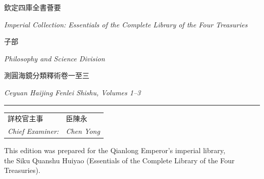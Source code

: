 \documentclass[11pt,a4paper]{article}
\newcommand{\shortline}{\noindent\rule{0.5\textwidth}{0.4pt}\par}
\begin{document}
\thispagestyle{empty}
\begin{center}
\vspace*{2.5cm}
{\LARGE 欽定四庫全書薈要}

\vspace{0.3cm}
{\normalsize\textit{Imperial Collection: Essentials of the Complete Library of the Four Treasuries}}

\vspace{1.2cm}
{\Large 子部}

\vspace{0.3cm}
{\normalsize\textit{Philosophy and Science Division}}

\vspace{1.5cm}
{\Large 測圓海鏡分類釋術卷一至三}

\vspace{0.3cm}
{\normalsize\textit{Ceyuan Haijing Fenlei Shishu, Volumes 1--3}}

\vspace{1.5cm}
\shortline

\vspace{0.8cm}
{\normalsize
\begin{tabular}{ll}
詳校官主事 & 臣陳永 \\
\textit{Chief Examiner:} & \textit{Chen Yong} \\
\end{tabular}
}

\vspace{2cm}
{\small\textcolor{notecolor}{%
This edition was prepared for the Qianlong Emperor's imperial library,\\
the Siku Quanshu Huiyao (Essentials of the Complete Library of the Four Treasuries).
}}

\end{center}
\clearpage

\tableofcontents
\clearpage


\end{document}
